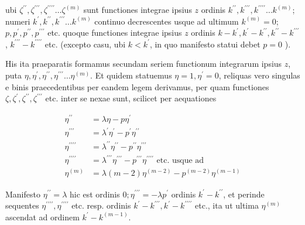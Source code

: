 \documentclass[10pt]{article}
\begin{document}
ubi \(\zeta^{\prime \prime}, \zeta^{\prime \prime \prime}, \zeta^{\prime \prime \prime \prime} \ldots \zeta^{(m)}\) sunt functiones integrae ipsius \(z\) ordinis \(k^{\prime \prime}, k^{\prime \prime \prime}, k^{\prime \prime \prime \prime} \ldots k^{(m)}\); numeri \(k^{\prime}, k^{\prime \prime}, k^{\prime \prime \prime} \ldots k^{(m)}\) continuo decrescentes usque ad ultimum \(k^{(m)}=0\); \(p, p^{\prime}, p^{\prime \prime}, p^{\prime \prime \prime}\) etc. quoque functiones integrae ipsius \(z\) ordinis \(k-k^{\prime}, k^{\prime}-k^{\prime \prime}, k^{\prime \prime}-k^{\prime \prime \prime}\), \(k^{\prime \prime \prime}-k^{\prime \prime \prime \prime}\) etc. (excepto casu, ubi \(k<k^{\prime}\), in quo manifesto statui debet \(p=0\) ).

His ita praeparatis formamus secundam seriem functionum integrarum ipsius \(z\), puta \(\eta, \eta^{\prime}, \eta^{\prime \prime}, \eta^{\prime \prime \prime} \ldots \eta^{(m)}\). Et quidem statuemus \(\eta=1, \eta^{\prime}=0\), reliquas vero
singulas e binis praecedentibus per eandem legem derivamus, per quam functiones \(\zeta, \zeta^{\prime}, \zeta^{\prime \prime}, \zeta^{\prime \prime \prime}\) etc. inter se nexae sunt, scilicet per aequationes

\[
\begin{aligned}
\eta^{\prime \prime} & =\lambda \eta-p \eta^{\prime} \\
\eta^{\prime \prime \prime} & =\lambda^{\prime} \eta^{\prime}-p^{\prime} \eta^{\prime \prime} \\
\eta^{\prime \prime \prime \prime} & =\lambda^{\prime \prime} \eta^{\prime \prime}-p^{\prime \prime} \eta^{\prime \prime \prime} \\
\eta^{\prime \prime \prime \prime} & =\lambda^{\prime \prime \prime} \eta^{\prime \prime \prime}-p^{\prime \prime \prime} \eta^{\prime \prime \prime \prime} \text { etc. usque ad } \\
\eta^{(m)} & =\lambda(m-2) \eta^{(m-2)}-p^{(m-2)} \eta^{(m-1)}
\end{aligned}
\]

Manifesto \(\eta^{\prime \prime}=\lambda\) hic est ordinis \(0 ; \eta^{\prime \prime \prime}=-\lambda p^{\prime}\) ordinis \(k^{\prime}-k^{\prime \prime}\), et perinde sequentes \(\eta^{\prime \prime \prime \prime}, \eta^{\prime \prime \prime \prime}\) etc. resp. ordinis \(k^{\prime}-k^{\prime \prime \prime}, k^{\prime}-k^{\prime \prime \prime \prime}\) etc., ita ut ultima \(\eta^{(m)}\) ascendat ad ordinem \(k^{\prime}-k^{(m-1)}\).
\end{document}
